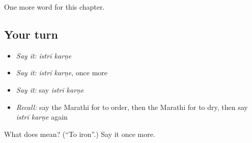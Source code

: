 \begin{grammarlens}[title={What you've built}]
One more word for this chapter.
\end{grammarlens}

\subsection*{Your turn}
\begin{itemize}
\raggedright
  \item \emph{Say it:} \emph{istrī karṇe}
  \item \emph{Say it:} \emph{istrī karṇe}, once more
  \item \emph{Say it:} say \emph{istrī karṇe}
  \item \emph{Recall:} say the Marathi for to order, then the Marathi for to dry, then say \emph{istrī karṇe} again
\end{itemize}

\begin{tcolorbox}[breakable,colback=teal!4,colframe=teal!35!black,title={Before you move on}]
What does   mean? (\textquotedblleft{}To iron\textquotedblright{}.) Say it once more.
\end{tcolorbox}
